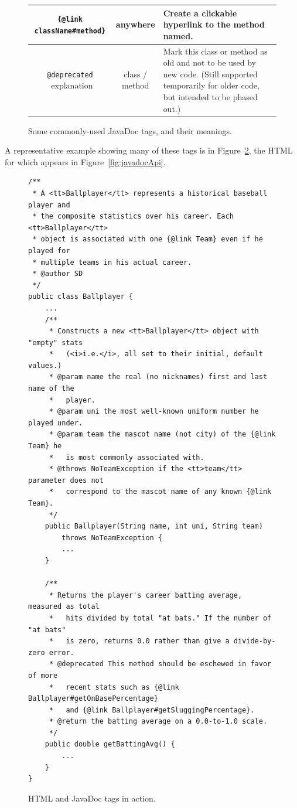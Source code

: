 \begin{figure}[ht]
\begin{tabularx}{\textwidth}{|c|c|X|}
\hline

\texttt{\{@link className\#method\}} & anywhere &
Create a clickable hyperlink to the method named.\\

\hline

\index{deprecated tag@\texttt{"@deprecated} tag}
\texttt{@deprecated} \ explanation &
\makecell{class / \\ method} & 
Mark this class or method as old and not to be used
by new code. (Still supported temporarily for older
code, but intended to be phased out.)\\

\hline

\end{tabularx}
\vspace{.1in}
\caption{Some commonly-used JavaDoc tags, and their meanings.}
\label{fig:taglist}
\end{figure}
\normalsize

A representative example showing many of these tags is in
Figure~\ref{fig:javadocTags}, the HTML for which appears in
Figure~\ref{fig:javadocApi}.

\begin{figure}
\begin{Verbatim}[fontsize=\scriptsize,samepage=true,frame=single]
/**
 * A <tt>Ballplayer</tt> represents a historical baseball player and
 * the composite statistics over his career. Each <tt>Ballplayer</tt>
 * object is associated with one {@link Team} even if he played for
 * multiple teams in his actual career.
 * @author SD
 */
public class Ballplayer {
    ...
    /**
     * Constructs a new <tt>Ballplayer</tt> object with "empty" stats
     *   (<i>i.e.</i>, all set to their initial, default values.)
     * @param name the real (no nicknames) first and last name of the
     *   player.
     * @param uni the most well-known uniform number he played under.
     * @param team the mascot name (not city) of the {@link Team} he
     *   is most commonly associated with.
     * @throws NoTeamException if the <tt>team</tt> parameter does not
     *   correspond to the mascot name of any known {@link Team}.
     */
    public Ballplayer(String name, int uni, String team)
        throws NoTeamException {
        ...
    }
    
    /**
     * Returns the player's career batting average, measured as total
     *   hits divided by total "at bats." If the number of "at bats"
     *   is zero, returns 0.0 rather than give a divide-by-zero error.
     * @deprecated This method should be eschewed in favor of more
     *   recent stats such as {@link Ballplayer#getOnBasePercentage}
     *   and {@link Ballplayer#getSluggingPercentage}.
     * @return the batting average on a 0.0-to-1.0 scale.
     */
    public double getBattingAvg() {
        ...
    }
}
\end{Verbatim}

\caption{HTML and JavaDoc tags in action.}
\label{fig:javadocTags}
\end{figure}


